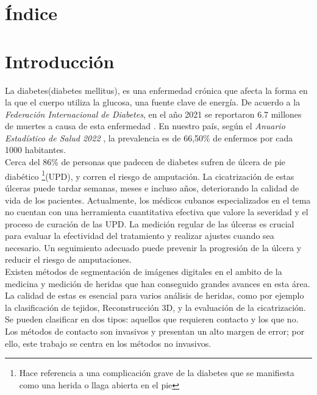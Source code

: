 \documentclass[12pt]{article}
\begin{document}
	\section{\'Indice}
	\tableofcontents
	\newpage
	\cleardoublepage
	
	
	\section{Introducci\'on}
	La diabetes(diabetes mellitus), es una enfermedad cr\'onica que afecta la forma en la que el cuerpo utiliza la glucosa, una fuente clave de energ\'ia. De acuerdo a la \textit{Federaci\'on Internacional de Diabetes}, en el a\~no 2021 se reportaron 6.7 millones de muertes a causa de esta enfermedad \parencite{DiabetesAtlas2024}. En nuestro pa\'is, seg\'un el \textit{Anuario Estadístico de Salud 2022} \parencite{msp2022}, la prevalencia es de 66,50\% de enfermos por cada 1000 habitantes.
	\\
	
	Cerca del 86\% de personas que padecen de diabetes sufren de \'ulcera de pie diab\'etico \footnote{Hace referencia a una complicaci\'on grave de la diabetes que se manifiesta como una herida o llaga abierta en el pie}(UPD), y corren el riesgo de amputaci\'on. La cicatrizaci\'on de estas \'ulceras puede tardar semanas, meses e incluso a\~nos, deteriorando la calidad de vida de los pacientes. Actualmente, los médicos cubanos especializados en el tema no cuentan con una herramienta cuantitativa efectiva que valore la severidad y el proceso de curación de las UPD. La medición regular de las úlceras es crucial para evaluar la efectividad del tratamiento y realizar ajustes cuando sea necesario. Un seguimiento adecuado puede prevenir la progresión de la úlcera y reducir el riesgo de amputaciones.
	\\
	
	
	Existen m\'etodos de segmentaci\'on de im\'agenes digitales en el ambito de la medicina y medici\'on de heridas que han conseguido grandes avances en esta \'area. La calidad de estas es esencial para varios an\'alisis de heridas, como por ejemplo la clasificaci\'on de tejidos, Reconstrucci\'on 3D, y la evaluaci\'on de la cicatrizaci\'on\parencite{Filko2023}. Se pueden clasificar en dos tipos: aquellos que requieren contacto y los que no. Los métodos de contacto son invasivos y presentan un alto margen de error; por ello, este trabajo se centra en los métodos no invasivos.
	\\
	
\end{document}
